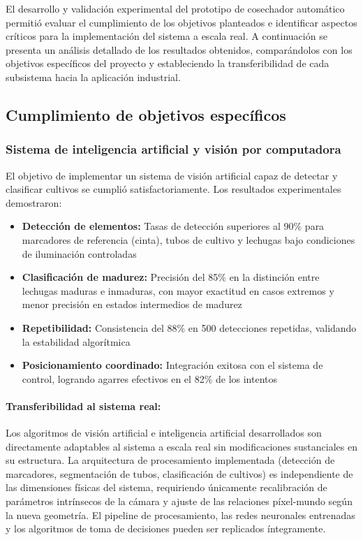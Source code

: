 El desarrollo y validación experimental del prototipo de cosechador automático permitió evaluar el cumplimiento de los objetivos planteados e identificar aspectos críticos para la implementación del sistema a escala real. A continuación se presenta un análisis detallado de los resultados obtenidos, comparándolos con los objetivos específicos del proyecto y estableciendo la transferibilidad de cada subsistema hacia la aplicación industrial.

\subsection{Cumplimiento de objetivos específicos}

\subsubsection{Sistema de inteligencia artificial y visión por computadora}

El objetivo de implementar un sistema de visión artificial capaz de detectar y clasificar cultivos se cumplió satisfactoriamente. Los resultados experimentales demostraron:

\begin{itemize}
    \item \textbf{Detección de elementos:} Tasas de detección superiores al 90\% para marcadores de referencia (cinta), tubos de cultivo y lechugas bajo condiciones de iluminación controladas
    \item \textbf{Clasificación de madurez:} Precisión del 85\% en la distinción entre lechugas maduras e inmaduras, con mayor exactitud en casos extremos y menor precisión en estados intermedios de madurez
    \item \textbf{Repetibilidad:} Consistencia del 88\% en 500 detecciones repetidas, validando la estabilidad algorítmica
    \item \textbf{Posicionamiento coordinado:} Integración exitosa con el sistema de control, logrando agarres efectivos en el 82\% de los intentos
\end{itemize}

\paragraph{Transferibilidad al sistema real:}

Los algoritmos de visión artificial e inteligencia artificial desarrollados son directamente adaptables al sistema a escala real sin modificaciones sustanciales en su estructura. La arquitectura de procesamiento implementada (detección de marcadores, segmentación de tubos, clasificación de cultivos) es independiente de las dimensiones físicas del sistema, requiriendo únicamente recalibración de parámetros intrínsecos de la cámara y ajuste de las relaciones píxel-mundo según la nueva geometría. El pipeline de procesamiento, las redes neuronales entrenadas y los algoritmos de toma de decisiones pueden ser replicados íntegramente.


